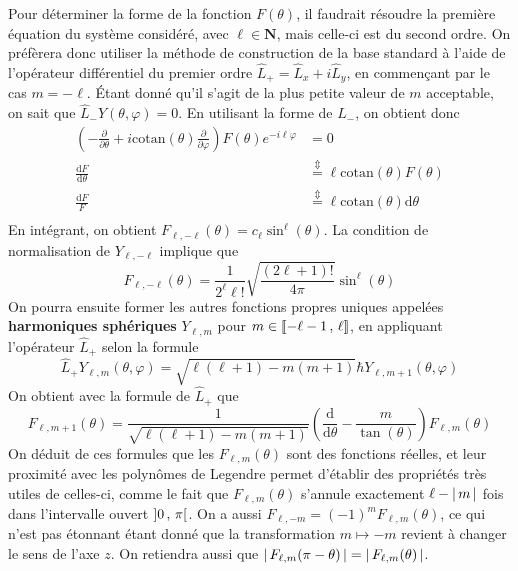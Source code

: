 \begin{demo}
        Pour déterminer la forme de la fonction $F(\theta)$, il faudrait résoudre la première équation du système considéré, avec $\ell \in \mathbf{N}$, mais celle-ci est du second ordre. On préfèrera donc utiliser la méthode de construction de la base standard à l’aide de l’opérateur différentiel du premier ordre $\hat{L}_+ = \hat{L}_x + i \hat{L}_y$, en commençant par le cas $m = -\ell$. Étant donné qu’il s’agit de la plus petite valeur de $m$ acceptable, on sait que $\hat{L}_- Y(\theta, \varphi) = 0$. En utilisant la forme de $L_-$, on obtient donc 
        \begin{align*}
            \left(-\frac{\partial }{\partial \theta} + i \text{cotan}(\theta) \frac{\partial }{\partial \varphi} \right) F(\theta) e^{- i \ell \varphi} &= 0 \\
            \frac{\text{d}F}{\text{d}\theta} &\overset{\Updownarrow}{=} \ell \text{cotan}(\theta) F(\theta) \\
            \frac{\text{d}F}{F} &\overset{\Updownarrow}{=} \ell \text{cotan}(\theta) \text{d}\theta \\
        \end{align*}
        En intégrant, on obtient $F_{\ell, -\ell}(\theta) = c_{\ell} \sin^{\ell}(\theta)$. La condition de normalisation de $Y_{\ell, -\ell}$ implique que 
        \[ F_{\ell, -\ell}(\theta) = \frac{1}{2^{\ell} \ell!} \sqrt{\frac{(2\ell + 1)!}{4\pi}} \sin^{\ell}(\theta) \]  
        On pourra ensuite former les autres fonctions propres uniques appelées \textbf{harmoniques sphériques} $Y_{\ell, m}$ pour $m \in \left[\!\left[ -\ell - 1 \, , \, \ell \right]\!\right]$, en appliquant l’opérateur $\hat{L}_+$ selon la formule 
        \[ \hat{L}_+ Y_{\ell, m}(\theta, \varphi) = \sqrt{\ell(\ell + 1) - m(m+1)}\hbar Y_{\ell, m+1}(\theta, \varphi) \] 
        On obtient avec la formule de $\hat{L}_+$ que 
        \[ F_{\ell, m+1}(\theta) = \frac{1}{\sqrt{\ell(\ell + 1) - m(m+1)}}\left(\frac{\text{d}}{\text{d}\theta} - \frac{m}{\tan(\theta)}\right) F_{\ell, m}(\theta) \]   
        On déduit de ces formules que les $F_{\ell,m}(\theta)$ sont des fonctions réelles, et leur proximité avec les polynômes de Legendre permet d’établir des propriétés très utiles de celles-ci, comme le fait que $F_{\ell,m}(\theta)$ s’annule exactement $\ell - \left\lvert \, m \, \right\rvert$ fois dans l’intervalle ouvert $\left] 0 \, , \, \pi \right[$. On a aussi $F_{\ell, -m} = (-1)^m F_{\ell,m}(\theta)$, ce qui n’est pas étonnant étant donné que la transformation $m \mapsto -m$ revient à changer le sens de l’axe $z$. On retiendra aussi que $\left\lvert \, F_{\ell,m}(\pi - \theta) \, \right\rvert = \left\lvert \, F_{\ell, m}(\theta) \, \right\rvert$.
        \end{demo}

